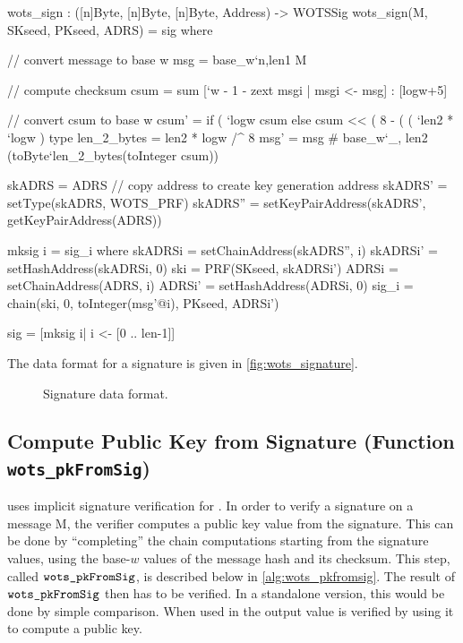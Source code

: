 \begin{code}
  wots_sign : ([n]Byte, [n]Byte, [n]Byte, Address) -> WOTSSig
  wots_sign(M, SKseed, PKseed, ADRS) = sig where

    // convert message to base w
    msg = base_w`{n,len1} M

    // compute checksum
    csum = sum [`w - 1 - zext msgi | msgi <- msg] : [logw+5]

    // convert csum to base w
    csum' =
      if ( `logw%
        csum
      else
        csum << ( 8 - ( ( `len2 * `logw ) %
    type len_2_bytes = len2 * logw /^ 8
    msg' = msg # base_w`{_, len2} (toByte`{len_2_bytes}(toInteger csum))

    skADRS = ADRS // copy address to create key generation address
    skADRS' = setType(skADRS, WOTS_PRF)
    skADRS'' = setKeyPairAddress(skADRS', getKeyPairAddress(ADRS))

    mksig i = sig_i where
      skADRSi = setChainAddress(skADRS'', i)
      skADRSi' = setHashAddress(skADRSi, 0)
      ski = PRF(SKseed, skADRSi')
      ADRSi = setChainAddress(ADRS, i)
      ADRSi' = setHashAddress(ADRSi, 0)
      sig_i = chain(ski, 0, toInteger(msg'@i), PKseed, ADRSi')

    sig = [mksig i| i <- [0 .. len-1]]
\end{code}

The data format for a signature is given in \autoref{fig:wots_signature}.

\begin{figure}[h!]
  \centering
  \caption{\wotsp Signature data format.}
  \label{fig:wots_signature}
\end{figure}

\subsection{\wotsp Compute Public Key from Signature (Function \texttt{wots\_pkFromSig})}
\spx uses implicit signature verification for \wotsp. In order to verify a 
\wotsp signature \wotssig on a message M, the verifier
computes a \wotsp public key value from the signature. This can be
done by ``completing'' the chain computations starting from the
signature values, using the base-$w$ values of the message hash and its
checksum. This step, called $\texttt{wots\_pkFromSig}$, is described below in
\autoref{alg:wots_pkfromsig}. The result of $\texttt{wots\_pkFromSig}$ 
then has to be verified. In a standalone version, this would be done by simple 
comparison. When used in \spx the output value is verified by using it to 
compute a \spx public key. 

